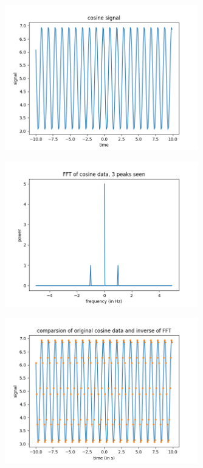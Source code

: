 \documentclass{article}
\begin{document}
\begin{figure}[h!]
\centering
\includegraphics[width=0.75\textwidth]{plots/cosine_signal.png}
\caption{\label{fig:cosine_signal}  }
\end{figure}

\begin{figure}[h!]
\centering
\includegraphics[width=0.75\textwidth]{plots/cosine_fft.png}
\caption{\label{fig:cosine_fft}  }
\end{figure}

\begin{figure}[h!]
\centering
\includegraphics[width=0.75\textwidth]{plots/cosine_inverse.png}
\caption{\label{fig:cosine_inverse}  }
\end{figure}
\end{document}
